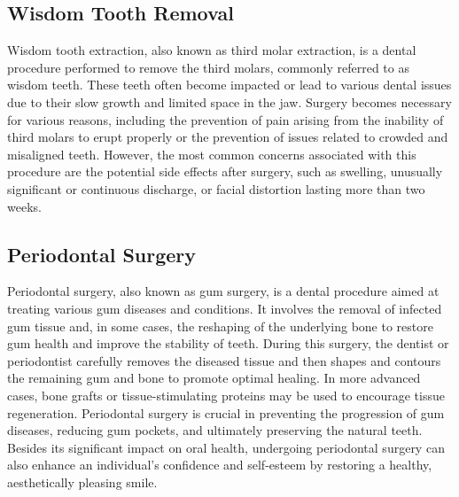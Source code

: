 \documentclass[12pt,oneside,openright,a4paper]{cpe-english-project}
\begin{document}
    \subsection{Wisdom Tooth Removal}
      \qquad Wisdom tooth extraction, also known as third molar extraction, is a dental procedure performed to remove the third molars, commonly referred to as wisdom teeth. These teeth often become impacted or lead to various dental issues due to their slow growth and limited space in the jaw. Surgery becomes necessary for various reasons, including the prevention of pain arising from the inability of third molars to erupt properly or the prevention of issues related to crowded and misaligned teeth. However, the most common concerns associated with this procedure are the potential side effects after surgery, such as swelling, unusually significant or continuous discharge, or facial distortion lasting more than two weeks.\par
  
    \subsection{Periodontal Surgery}
      \qquad Periodontal surgery, also known as gum surgery, is a dental procedure aimed at treating various gum diseases and conditions. It involves the removal of infected gum tissue and, in some cases, the reshaping of the underlying bone to restore gum health and improve the stability of teeth. During this surgery, the dentist or periodontist carefully removes the diseased tissue and then shapes and contours the remaining gum and bone to promote optimal healing. In more advanced cases, bone grafts or tissue-stimulating proteins may be used to encourage tissue regeneration. Periodontal surgery is crucial in preventing the progression of gum diseases, reducing gum pockets, and ultimately preserving the natural teeth. Besides its significant impact on oral health, undergoing periodontal surgery can also enhance an individual's confidence and self-esteem by restoring a healthy, aesthetically pleasing smile.\par
  
\end{document}
